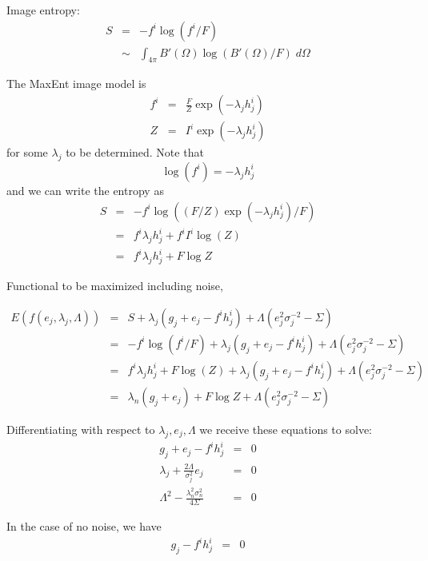 \documentclass[12pt]{book}
\begin{document}
Image entropy:
\begin{eqnarray}
S &=& -f^i \log(f^i/F) \\
&\sim& \int_{4\pi} B'(\Omega) \log( B'(\Omega)/F) \; d\Omega
\end{eqnarray}

The MaxEnt image model is
\begin{eqnarray}
f^i &=&\frac{F}{Z}\exp(-\lambda_j h_j^i) \\
Z &=& I^i \exp(-\lambda_j h_j^i)
\end{eqnarray}
for some $\lambda_j$ to be determined.  Note that
\begin{equation}
\log(f^i) = -\lambda_j h_j^i
\end{equation}
and we can write the entropy as
\begin{eqnarray}
S &=& -f^i\log((F/Z)\exp(-\lambda_j h_j^i)/F) \\
 &=& f^i \lambda_j h_j^i + f^i I^i\log(Z) \\
 &=& f^i \lambda_j h_j^i + F \log Z
\end{eqnarray}


Functional to be maximized including noise, 

\begin{eqnarray}
E(f(e_j, \lambda_j, \Lambda)) &=& S + \lambda_j(g_j + e_j - f^i h^i_j) + \Lambda(e_j^2 \sigma_j^{-2} - \Sigma) \\
&=& -f^i \log(f^i/F)+ \lambda_j(g_j + e_j - f^i h^i_j) + \Lambda(e_j^2 \sigma_j^{-2} - \Sigma) \nonumber \\
&=& f^i \lambda_j h_j^i + F \log(Z) + \lambda_j(g_j + e_j - f^i h^i_j) + \Lambda(e_j^2 \sigma_j^{-2} - \Sigma) \nonumber \\
&=& \lambda_n(g_j + e_j) + F \log Z + \Lambda(e_j^2 \sigma_j^{-2} - \Sigma) 
\end{eqnarray} 

Differentiating with respect to $\lambda_j, e_j, \Lambda$ we receive these equations to solve:
\begin{eqnarray}
g_j + e_j - f^i h^i_j &=& 0 \\[1em]
\lambda_j + \frac{2\Lambda}{\sigma_j^2} e_j &=& 0 \\[0.5em]
\Lambda^2 - \frac{\lambda_n^2 \sigma_n^2}{4\Sigma} &=& 0
\end{eqnarray}

In the case of no noise, we have
\begin{eqnarray}
g_j - f^i h^i_j &=& 0 
\end{eqnarray}
\end{document}

